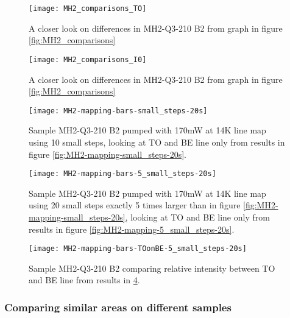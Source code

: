 \begin{figure}[H]
\centering
\texttt{[image: MH2\_comparisons\_TO]}
\caption[MH2-Q3-210 comparisons close]{A closer look on differences in MH2-Q3-210 B2 from graph in figure \ref{fig:MH2_comparisons} } 
\label{fig:MH2_comparisons_TO}%
\end{figure}

\begin{figure}[H]
\centering
\texttt{[image: MH2\_comparisons\_I0]}
\caption[MH2-Q3-210 comparisons close]{A closer look on differences in MH2-Q3-210 B2 from graph in figure \ref{fig:MH2_comparisons} } 
\label{fig:MH2_comparisons_I0}%
\end{figure}




\begin{figure}[H]
\centering
\texttt{[image: MH2-mapping-bars-small\_steps-20s]}
\caption[MH2-Q3-210 line mapping]{Sample MH2-Q3-210 B2 pumped with 170mW at 14K line map using 10 small steps, looking at TO and BE line only from results in figure \ref{fig:MH2-mapping-small_steps-20s}.}
\label{fig:MH2-mapping-bars-small_steps-20s}%
\end{figure}

\begin{figure}[H]
\centering
\texttt{[image: MH2-mapping-bars-5\_small\_steps-20s]}
\caption[MH2-Q3-210 line mapping]{Sample MH2-Q3-210 B2 pumped with 170mW at 14K line map using 20 small steps exactly 5 times larger than in figure \ref{fig:MH2-mapping-small_steps-20s}, looking at TO and BE line only from results in figure \ref{fig:MH2-mapping-5_small_steps-20s}.}
\label{fig:MH2-mapping-bars-5_small_steps-20s}%
\end{figure}


\begin{figure}[H]
\centering
\texttt{[image: MH2-mapping-bars-TOonBE-5\_small\_steps-20s]}
\caption[MH2-Q3-210 line mapping]{Sample MH2-Q3-210 B2 comparing relative intensity between TO and BE line from results in \ref{fig:MH2-mapping-bars-5_small_steps-20s}.}
\label{fig:MH2-mapping-bars-TOonBE-5_small_steps-20s}%
\end{figure}


\subsubsection{Comparing similar areas on different samples}



